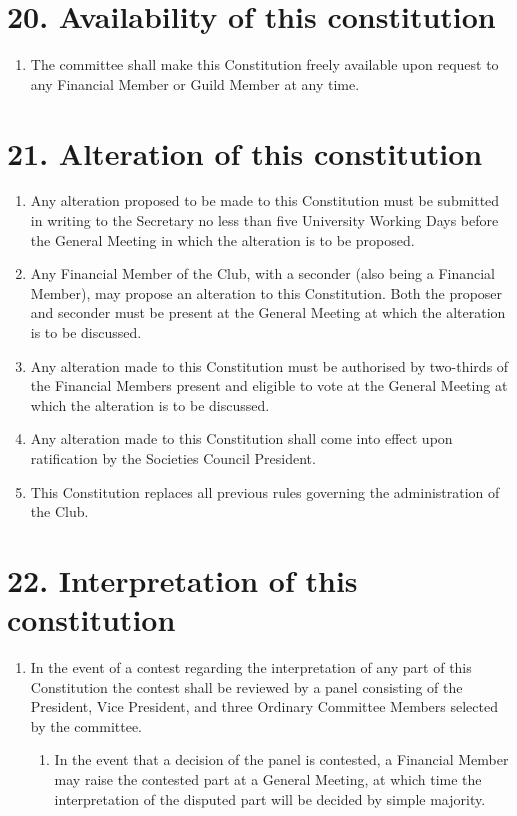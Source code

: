 \documentclass[12pt]{article}
\begin{document}
\section{20. Availability of this constitution}
\begin{enumerate}[label=20.\arabic*]
 \item The committee shall make this Constitution freely available upon request to any Financial Member or Guild Member at any time.
\end{enumerate}

\section{21. Alteration of this constitution}
\begin{enumerate}[label=21.\arabic*]
\item Any alteration proposed to be made to this Constitution must be submitted in writing to the Secretary no less than five University Working Days before the General Meeting in which the alteration is to be proposed.
\item Any Financial Member of the Club, with a seconder (also being a Financial Member), may propose an alteration to this Constitution. Both the proposer and seconder must be present at the General Meeting at which the alteration is to be discussed.
\item Any alteration made to this Constitution must be authorised by two-thirds of the Financial Members present and eligible to vote at the General Meeting at which the alteration is to be discussed.
\item Any alteration made to this Constitution shall come into effect upon ratification by the Societies Council President.
\item This Constitution replaces all previous rules governing the administration of the Club.
\end{enumerate}

\section{22. Interpretation of this constitution}
\begin{enumerate}[label=22.\arabic*]
\item In the event of a contest regarding the interpretation of any part of this Constitution the contest shall be reviewed by a panel consisting of the President, Vice President, and three Ordinary Committee Members selected by the committee.
    \begin{enumerate}[label=22.1.\arabic*]
    \item In the event that a decision of the panel is contested, a Financial Member may raise the contested part at a General Meeting, at which time the interpretation of the disputed part will be decided by simple majority.
    \end{enumerate}
\end{enumerate}
\end{document}
